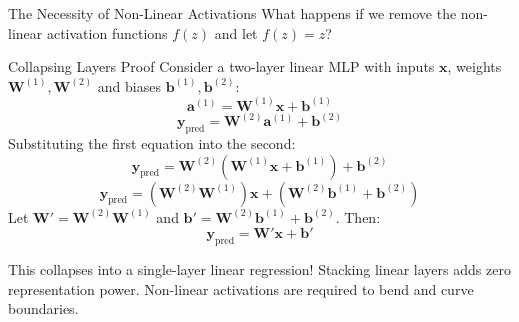 \documentclass[9pt]{beamer}
\begin{document}
\begin{frame}{The Necessity of Non-Linear Activations}
  What happens if we remove the non-linear activation functions $f(z)$ and let $f(z) = z$?
  \begin{block}{Collapsing Layers Proof}
    Consider a two-layer linear MLP with inputs $\mathbf{x}$, weights $\mathbf{W}^{(1)}, \mathbf{W}^{(2)}$ and biases $\mathbf{b}^{(1)}, \mathbf{b}^{(2)}$:
    $$\mathbf{a}^{(1)} = \mathbf{W}^{(1)} \mathbf{x} + \mathbf{b}^{(1)}$$
    $$\mathbf{y}_{\text{pred}} = \mathbf{W}^{(2)} \mathbf{a}^{(1)} + \mathbf{b}^{(2)}$$
    Substituting the first equation into the second:
    $$\mathbf{y}_{\text{pred}} = \mathbf{W}^{(2)} \left( \mathbf{W}^{(1)} \mathbf{x} + \mathbf{b}^{(1)} \right) + \mathbf{b}^{(2)}$$
    $$\mathbf{y}_{\text{pred}} = \left( \mathbf{W}^{(2)} \mathbf{W}^{(1)} \right) \mathbf{x} + \left( \mathbf{W}^{(2)} \mathbf{b}^{(1)} + \mathbf{b}^{(2)} \right)$$
    Let $\mathbf{W}' = \mathbf{W}^{(2)} \mathbf{W}^{(1)}$ and $\mathbf{b}' = \mathbf{W}^{(2)} \mathbf{b}^{(1)} + \mathbf{b}^{(2)}$. Then:
    $$\mathbf{y}_{\text{pred}} = \mathbf{W}' \mathbf{x} + \mathbf{b}'$$
  \end{block}
  This collapses into a single-layer linear regression! Stacking linear layers adds zero representation power. Non-linear activations are required to bend and curve boundaries.
\end{frame}
\end{document}
